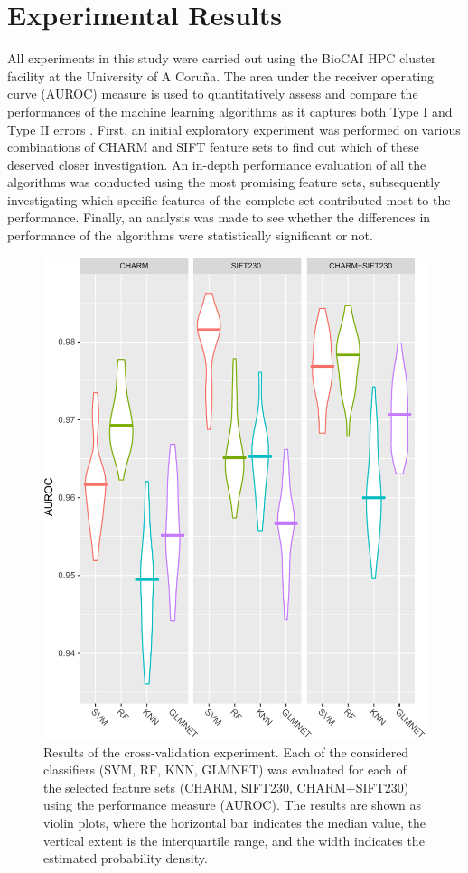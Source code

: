 \section{Experimental Results}
\label{sec:experimental-results}
All experiments in this study were carried out using the BioCAI HPC cluster facility at the University of A Coru\~{n}a. The area under the receiver operating curve (AUROC) measure is used to quantitatively assess and compare the performances of the machine learning algorithms as it captures both Type I and Type II errors \cite{fawcett2006introduction}. First, an initial exploratory experiment was performed on various combinations of CHARM and SIFT feature sets to find out which of these deserved closer investigation. An in-depth performance evaluation of all the algorithms was conducted using the most promising feature sets, subsequently investigating which specific features of the complete set contributed most to the performance. Finally, an analysis was made to see whether the differences in performance of the algorithms were statistically significant or not.
\begin{figure}[h!]
	\centering
	\includegraphics[width=0.9\columnwidth]{fig05}
	\caption{Results of the cross-validation experiment. Each of the considered classifiers (SVM, RF, KNN, GLMNET) was evaluated for each of the selected feature sets (CHARM, SIFT230, CHARM+SIFT230) using the performance measure (AUROC). The results are shown as violin plots, where the horizontal bar indicates the median value, the vertical extent is the interquartile range, and the width indicates the estimated probability density.}
	\label{fig:fullCVresults}
\end{figure}
